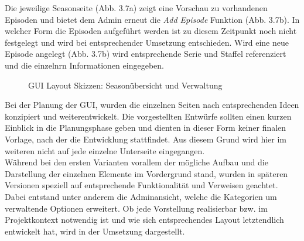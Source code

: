 Die jeweilige Seasonseite (Abb. 3.7a) zeigt eine Vorschau zu vorhandenen Episoden und bietet dem Admin erneut die \textit{Add Episode} Funktion (Abb. 3.7b). In welcher Form die Episoden aufgeführt werden ist zu diesem Zeitpunkt noch nicht festgelegt und wird bei entsprechender Umsetzung entschieden. Wird eine neue Episode angelegt (Abb. 3.7b) wird entsprechende Serie und Staffel referenziert und die einzelnrn Informationen eingegeben.\\
\begin{figure} [h!]
\centering
\hfill %
\hfill %
\hfill %
\caption{GUI Layout Skizzen: Seasonübersicht und Verwaltung }
\label{gui-skizzen-season-verwaltung}
\end{figure}

Bei der Planung der GUI, wurden die einzelnen Seiten nach entsprechenden Ideen konzipiert und weiterentwickelt. Die vorgestellten Entwürfe sollten einen kurzen Einblick in die Planungsphase geben und dienten in dieser Form keiner finalen Vorlage, nach der die Entwicklung stattfindet. Aus diesem Grund wird hier im weiteren nicht auf jede einzelne Unterseite eingegangen.\\ Während bei den ersten Varianten vorallem der mögliche Aufbau und die Darstellung der einzelnen Elemente im Vordergrund stand, wurden in späteren Versionen speziell auf entsprechende Funktionalität und Verweisen geachtet. Dabei entstand unter anderem die Adminansicht, welche die Kategorien um verwaltende Optionen erweitert. Ob jede Vorstellung realisierbar bzw. im Projektkontext notwendig ist und wie sich entsprechendes Layout letztendlich entwickelt hat, wird in der Umsetzung dargestellt.\\

